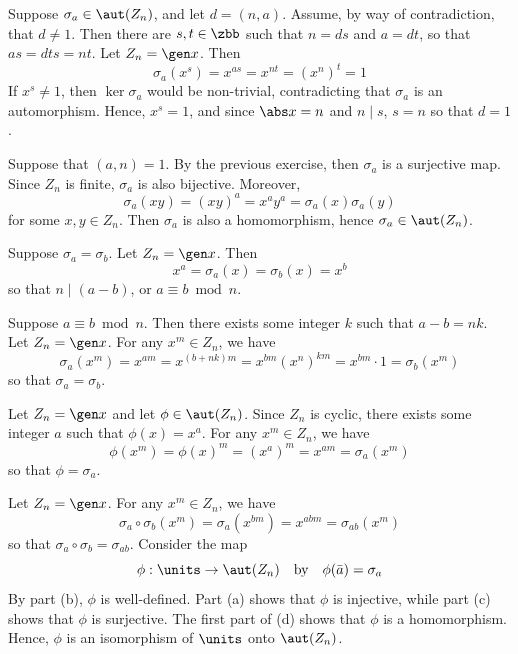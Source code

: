 \begin{solenum}[spsol]
    \item \rightimp Suppose $\sigma_a \in \aut(Z_n)$, and let $d = (n, a)$.
	Assume, by way of contradiction, that $d \neq 1$.
	Then there are $s, t \in \zbb$ such that $n = ds$ and $a = dt$, so that $as = dts = nt$.
	Let $Z_n = \gen x$.
	Then
    \[
        \sigma_a(x^s) = x^{as} = x^{nt} = (x^n)^t = 1
    \]
    If $x^s \neq 1$, then $\ker\sigma_a$ would be non-trivial, contradicting that $\sigma_a$ is an automorphism.
	Hence, $x^s = 1$, and since $\abs x = n$ and $n \mid s$, $s = n$ so that $d = 1$.
    
    \leftimp Suppose that $(a, n) = 1$.
	By the previous exercise, then $\sigma_a$ is a surjective map.
	Since $Z_n$ is finite, $\sigma_a$ is also bijective.
	Moreover,
    \[
        \sigma_a(xy) = (xy)^a = x^ay^a = \sigma_a(x)\sigma_a(y)
    \]
    for some $x, y \in Z_n$.
	Then $\sigma_a$ is also a homomorphism, hence $\sigma_a \in \aut(Z_n)$.
    \item
    \rightimp Suppose $\sigma_a = \sigma_b$.
	Let $Z_n = \gen x$.
	Then
    \[
        x^a = \sigma_a(x) = \sigma_b(x) = x^b
    \]
    so that $n \mid (a - b)$, or $a \equiv b \bmod n$.

    \leftimp Suppose $a \equiv b \bmod n$.
	Then there exists some integer $k$ such that $a - b = nk$.
	Let $Z_n = \gen x$.
	For any $x^m \in Z_n$, we have
    \[
        \sigma_a(x^m) = x^{am} = x^{(b + nk)m} = x^{bm} (x^n)^{km} = x^{bm} \cdot 1 = \sigma_b(x^m)
    \]
    so that $\sigma_a = \sigma_b$.
    \item Let $Z_n = \gen x$ and let $\phi \in \aut(Z_n)$.
	Since $Z_n$ is cyclic, there exists some integer $a$ such that $\phi(x) = x^a$.
	For any $x^m \in Z_n$, we have
    \[
    	\phi(x^m) = \phi(x)^m = (x^a)^m = x^{am} = \sigma_a(x^m)
    \]
    so that $\phi = \sigma_a$.
    \item Let $Z_n = \gen x$.
	For any $x^m \in Z_n$, we have
    \[
    	\sigma_a \circ \sigma_b (x^m) = \sigma_a(x^{bm}) = x^{abm} = \sigma_{ab}(x^m)
    \]
    so that $\sigma_a \circ \sigma_b = \sigma_{ab}$.
	Consider the map
    \[
    	\phi : \units \to \aut(Z_n) \quad \text{by} \quad \phi(\bar a) = \sigma_a
    \]
    By part (b), $\phi$ is well-defined.
	Part (a) shows that $\phi$ is injective, while part (c) shows that $\phi$ is surjective.
	The first part of (d) shows that $\phi$ is a homomorphism.
	Hence, $\phi$ is an isomorphism of $\units$ onto $\aut(Z_n)$.
\end{solenum}